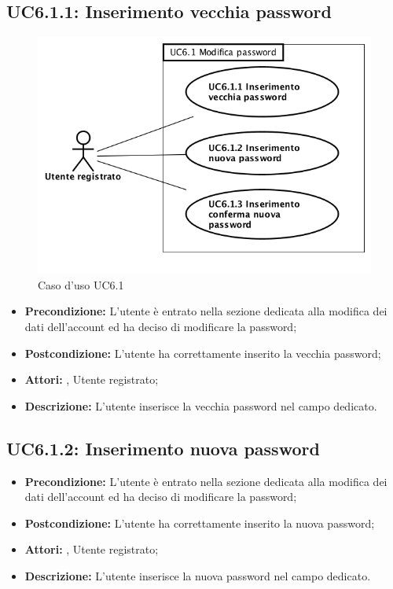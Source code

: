 \subsection{ UC6.1.1: Inserimento vecchia password}

\begin{figure}[h]
	\begin{center}
	\includegraphics[scale=0.4]{diagram/UC6-1.png}
	\caption{Caso d'uso UC6.1}
	\end{center}
\end{figure}
\begin{itemize}
	\item \textbf{Precondizione:} L’utente è entrato nella sezione dedicata alla modifica dei dati dell’account ed ha deciso di modificare la password;
	\item \textbf{Postcondizione:} L’utente ha correttamente inserito la vecchia password;
	\item \textbf{Attori:} , Utente registrato;
	\item \textbf{Descrizione:} L’utente inserisce la vecchia password nel campo dedicato.
\end{itemize}
\subsection{ UC6.1.2: Inserimento nuova password}

\begin{itemize}
	\item \textbf{Precondizione:} L’utente è entrato nella sezione dedicata alla modifica dei dati dell’account ed ha deciso di modificare la password;
	\item \textbf{Postcondizione:}  L’utente ha correttamente inserito la nuova password;
	\item \textbf{Attori:} , Utente registrato;
	\item \textbf{Descrizione:} L’utente inserisce la nuova password nel campo dedicato.
\end{itemize}
